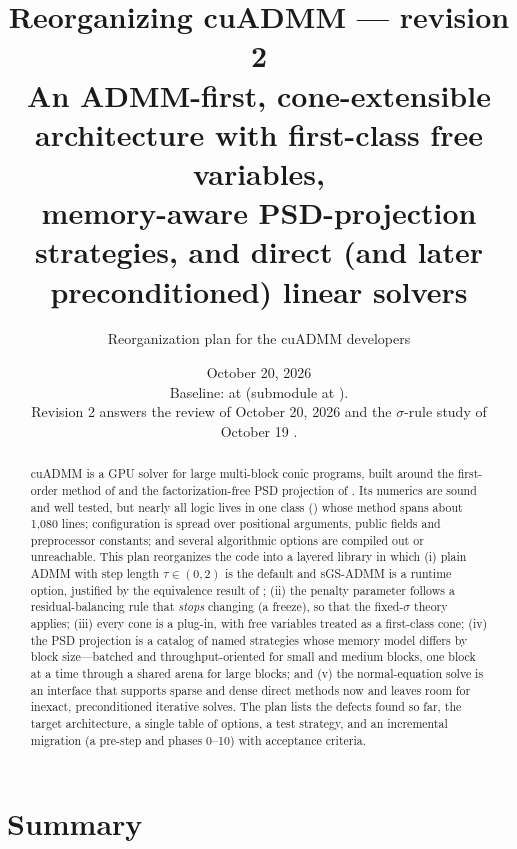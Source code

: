 \documentclass[11pt]{article}
\title{\textbf{Reorganizing cuADMM} --- revision 2\\[4pt]
\large An ADMM-first, cone-extensible architecture with first-class free variables,\\
memory-aware PSD-projection strategies, and direct (and later preconditioned) linear solvers}
\author{Reorganization plan for the cuADMM developers}
\date{October 20, 2026\\[2pt]
\small Baseline: \code{main} at \code{2d8a755} (submodule \code{psd_projection} at \code{b566590}).\\
\small Revision 2 answers the review of October 20, 2026 \cite{review20} and the $\sigma$-rule study of October 19 \cite{sigmastudy}.}
\begin{document}
\maketitle

\begin{abstract}
cuADMM is a GPU solver for large multi-block conic programs, built around the first-order method of
\cite{cuadmm} and the factorization-free PSD projection of \cite{composite}. Its numerics are sound and
well tested, but nearly all logic lives in one class () whose  method spans
about 1{,}080 lines; configuration is spread over positional arguments, public fields and preprocessor
constants; and several algorithmic options are compiled out or unreachable. This plan reorganizes the code
into a layered library in which (i) plain ADMM with step length $\tau\in(0,2)$ is the default and sGS-ADMM
is a runtime option, justified by the equivalence result of \cite{afterimage}; (ii) the penalty parameter
follows a residual-balancing rule that \emph{stops} changing (a freeze), so that the fixed-$\sigma$ theory
applies; (iii) every cone is a plug-in, with free variables treated as a first-class cone; (iv) the PSD
projection is a catalog of named strategies whose memory model differs by block size---batched and
throughput-oriented for small and medium blocks, one block at a time through a shared arena for large
blocks; and (v) the normal-equation solve is an interface that supports sparse and dense direct methods now
and leaves room for inexact, preconditioned iterative solves. The plan lists the defects found so far, the
target architecture, a single table of options, a test strategy, and an incremental migration (a pre-step
and phases 0--10) with acceptance criteria.
\end{abstract}

\tableofcontents

\section{Summary}\label{sec:summary}
\end{document}
